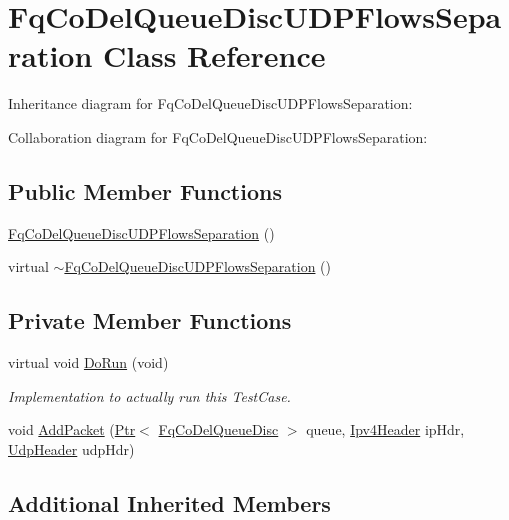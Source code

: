 \hypertarget{classFqCoDelQueueDiscUDPFlowsSeparation}{}\section{Fq\+Co\+Del\+Queue\+Disc\+U\+D\+P\+Flows\+Separation Class Reference}
\label{classFqCoDelQueueDiscUDPFlowsSeparation}


Inheritance diagram for Fq\+Co\+Del\+Queue\+Disc\+U\+D\+P\+Flows\+Separation\+:


Collaboration diagram for Fq\+Co\+Del\+Queue\+Disc\+U\+D\+P\+Flows\+Separation\+:
\subsection*{Public Member Functions}
\begin{DoxyCompactItemize}
\item 
\hyperlink{classFqCoDelQueueDiscUDPFlowsSeparation_afaf9e28747fd3be914d262db835c1cc5}{Fq\+Co\+Del\+Queue\+Disc\+U\+D\+P\+Flows\+Separation} ()
\item 
virtual \hyperlink{classFqCoDelQueueDiscUDPFlowsSeparation_aa0591d532d2357299a900e13860bb925}{$\sim$\+Fq\+Co\+Del\+Queue\+Disc\+U\+D\+P\+Flows\+Separation} ()
\end{DoxyCompactItemize}
\subsection*{Private Member Functions}
\begin{DoxyCompactItemize}
\item 
virtual void \hyperlink{classFqCoDelQueueDiscUDPFlowsSeparation_a9a290a3d299c1bdef1daac72ce8d4919}{Do\+Run} (void)
\begin{DoxyCompactList}\small\item\em Implementation to actually run this Test\+Case. \end{DoxyCompactList}\item 
void \hyperlink{classFqCoDelQueueDiscUDPFlowsSeparation_a632c0fbc4d46616fedb0b9ab9f75e769}{Add\+Packet} (\hyperlink{classns3_1_1Ptr}{Ptr}$<$ \hyperlink{classns3_1_1FqCoDelQueueDisc}{Fq\+Co\+Del\+Queue\+Disc} $>$ queue, \hyperlink{classns3_1_1Ipv4Header}{Ipv4\+Header} ip\+Hdr, \hyperlink{classns3_1_1UdpHeader}{Udp\+Header} udp\+Hdr)
\end{DoxyCompactItemize}
\subsection*{Additional Inherited Members}


